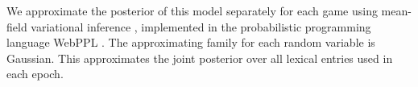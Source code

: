 \documentclass[10pt,letterpaper]{article}
\newcommand{\ndg}[1]{\textcolor{Green}{[ndg: #1]}}
\begin{document}
We approximate the posterior of this model separately for each game using mean-field variational inference \cite{RanganathGerrishBlei13_BlackBoxVariationalInference}, implemented in the probabilistic programming language WebPPL \cite{GoodmanStuhlmuller14_DIPPL,DAIPP}. 
The approximating family for each random variable is Gaussian. This approximates the joint posterior over all lexical entries used in each epoch. 





\end{document}
